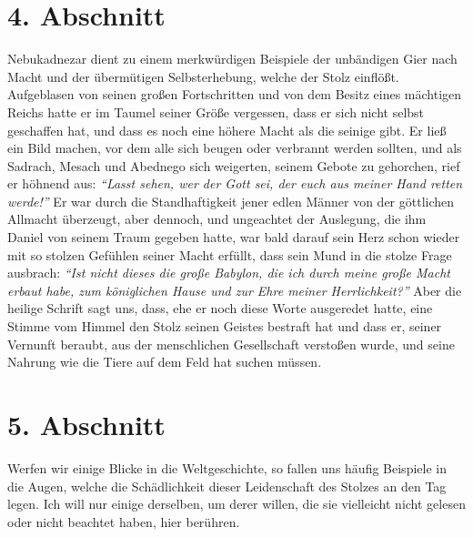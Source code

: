\section{4. Abschnitt} \label{kap8_ab4}

Nebukadnezar dient zu einem merkwürdigen Beispiele
der unbändigen Gier nach
Macht und der übermütigen Selbsterhebung, welche der Stolz einflößt.
Aufgeblasen
von seinen großen Fortschritten und von dem Besitz eines mächtigen Reichs hatte
er im Taumel seiner Größe vergessen, dass er sich nicht selbst geschaffen hat,
und dass es noch eine höhere Macht als die seinige gibt. Er ließ ein Bild
machen,
vor dem alle sich beugen oder verbrannt werden sollten, und als
Sadrach, Mesach
und Abednego sich weigerten, seinem Gebote zu
gehorchen, rief er höhnend aus:
\textit{"`Lasst sehen, wer der Gott sei, der euch aus meiner Hand retten
werde!"'}
Er war durch die Standhaftigkeit jener edlen Männer
von der göttlichen Allmacht überzeugt, aber dennoch,
und ungeachtet der
Auslegung, die ihm Daniel von seinem Traum gegeben
hatte, war bald darauf sein
Herz schon wieder mit so stolzen Gefühlen seiner Macht erfüllt, dass sein Mund
in
die stolze Frage ausbrach:
\textit{"`Ist nicht dieses die große Babylon, die ich
durch meine große Macht erbaut habe, zum königlichen Hause und zur Ehre meiner
Herrlichkeit?"'}
Aber die heilige Schrift sagt uns, dass, ehe
er noch diese Worte ausgeredet hatte, eine Stimme vom Himmel den Stolz seinen
Geistes bestraft hat und dass er, seiner Vernunft beraubt, aus der menschlichen
Gesellschaft verstoßen wurde, und seine Nahrung wie die Tiere auf dem
Feld hat suchen müssen.

\section{5. Abschnitt} \label{kap8_ab5}

Werfen wir einige Blicke in die Weltgeschichte, so fallen uns häufig Beispiele
in die Augen, welche die Schädlichkeit dieser Leidenschaft des Stolzes an den
Tag legen. Ich will nur einige derselben, um derer willen, die sie
vielleicht
nicht gelesen oder nicht beachtet haben, hier berühren.

